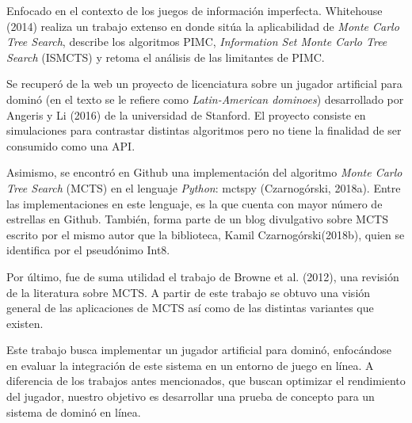 Enfocado en el contexto de los juegos de información imperfecta. Whitehouse
(2014) realiza un trabajo extenso en donde sitúa la aplicabilidad de
\textit{Monte Carlo Tree Search}, describe los algoritmos PIMC,
\textit{Information Set Monte Carlo Tree Search} (ISMCTS) y retoma el análisis
de las limitantes de PIMC.


Se recuperó de la web un proyecto de licenciatura sobre un jugador artificial
para dominó (en el texto se le refiere como \textit{Latin-American dominoes})
desarrollado por Angeris y Li (2016) de la universidad de Stanford. El proyecto
consiste en simulaciones para contrastar distintas algoritmos pero no tiene la
finalidad de ser consumido como una API.

Asimismo, se encontró en Github una implementación del algoritmo \textit{Monte
    Carlo Tree Search} (MCTS) en el lenguaje \textit{Python}: mctspy (Czarnogórski,
2018a). Entre las implementaciones en este lenguaje, es la que cuenta con mayor
número de estrellas en Github. También, forma parte de un blog divulgativo sobre
MCTS escrito por el mismo autor que la biblioteca, Kamil Czarnogórski(2018b),
quien se identifica por el pseudónimo Int8.

Por último, fue de suma utilidad el trabajo de Browne et al. (2012), una revisión
de la literatura sobre MCTS. A partir de este trabajo se obtuvo una visión general
de las aplicaciones de MCTS así como de las distintas variantes que existen.

Este trabajo busca implementar un jugador artificial para dominó, enfocándose en
evaluar la integración de este sistema en un entorno de juego en línea. A
diferencia de los trabajos antes mencionados, que buscan optimizar el
rendimiento del jugador, nuestro objetivo es desarrollar una prueba de concepto
para un sistema de dominó en línea.




